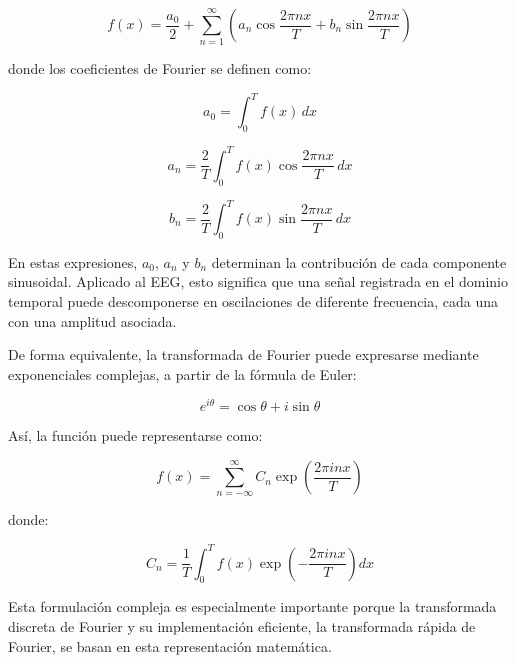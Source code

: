 \documentclass[../main.tex]{subfiles}
\begin{document}
\begin{equation}
    f(x) =
    \frac{a_0}{2}
    +
    \sum_{n=1}^{\infty}
    \left(
    a_n \cos \frac{2\pi n x}{T}
    +
    b_n \sin \frac{2\pi n x}{T}
    \right)
    \label{eq:fourier_series}
\end{equation}

donde los coeficientes de Fourier se definen como:

\begin{equation}
    a_0 = \int_0^T f(x)\,dx
    \label{eq:a0}
\end{equation}

\begin{equation}
    a_n =
    \frac{2}{T}
    \int_0^T
    f(x)\cos \frac{2\pi n x}{T}\,dx
    \label{eq:an}
\end{equation}

\begin{equation}
    b_n =
    \frac{2}{T}
    \int_0^T
    f(x)\sin \frac{2\pi n x}{T}\,dx
    \label{eq:bn}
\end{equation}

En estas expresiones, \(a_0\), \(a_n\) y \(b_n\) determinan la contribución de cada componente sinusoidal. Aplicado al EEG, esto significa que una señal registrada en el dominio temporal puede descomponerse en oscilaciones de diferente frecuencia, cada una con una amplitud asociada.

De forma equivalente, la transformada de Fourier puede expresarse mediante exponenciales complejas, a partir de la fórmula de Euler:

\begin{equation}
    e^{i\theta} = \cos \theta + i \sin \theta
    \label{eq:euler}
\end{equation}

Así, la función puede representarse como:

\begin{equation}
    f(x) =
    \sum_{n=-\infty}^{\infty}
    C_n
    \exp \left(
    \frac{2\pi i n x}{T}
    \right)
    \label{eq:complex_fourier}
\end{equation}

donde:

\begin{equation}
    C_n =
    \frac{1}{T}
    \int_0^T
    f(x)
    \exp \left(
    -\frac{2\pi i n x}{T}
    \right)
    dx
    \label{eq:complex_coefficients}
\end{equation}

Esta formulación compleja es especialmente importante porque la transformada discreta de Fourier y su implementación eficiente, la transformada rápida de Fourier, se basan en esta representación matemática.
\end{document}
